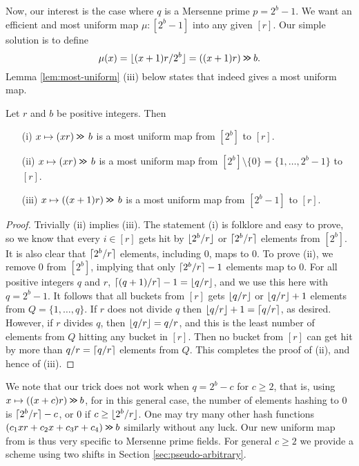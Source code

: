 Now, our interest is the case where $q$ is a Mersenne prime $p=2^b-1$. We want
an efficient and most uniform map $\mu:[2^b-1]$ into any given $[r]$.
Our simple solution is to define
\begin{equation}\label{eq:most-uniform}
   \mu(x)=\lfloor {(x+1)r/2^b} \rfloor=((x+1)r)\mathbin{\texttt{>\!>}} b.
\end{equation}
Lemma \ref{lem:most-uniform} (iii) below 
states that  indeed
gives a most uniform map. 
\begin{lemma}\label{lem:most-uniform} Let $r$ and $b$ be positive integers.
   Then
   \begin{itemize}
      \item[(i)] $x\mapsto (xr)\mathbin{\texttt{>\!>}}\,b$ is a most
         uniform map from $[2^b]$ to $[r]$.
      \item[(ii)] $x\mapsto (xr)\mathbin{\texttt{>\!>}}\,b$ is a most
         uniform map from $[2^b]\setminus\{0\}=\{1,\ldots,2^b-1\}$ to $[r]$.
      \item[(iii)] $x\mapsto ((x+1)r)\mathbin{\texttt{>\!>}} \, b$ is a most
         uniform map from $[2^b-1]$ to $[r]$.
   \end{itemize}
\end{lemma}
\begin{proof}
   Trivially (ii) implies (iii). 
   The statement (i) is folklore and easy to prove, so we know that every
   $i\in[r]$ gets hit by $\lfloor {2^b/r} \rfloor$ or $\lceil {2^b/r}\rceil$ elements from
   $[2^b]$. It is also clear that $\lceil {2^b/r}\rceil$ elements, including $0$,
   maps to $0$. To prove (ii), we remove $0$ from $[2^b]$, 
   implying that only
   $\lceil {2^b/r}\rceil-1$ elements map to $0$. For all positive integers $q$
   and $r$, $\lceil {(q+1)/r}\rceil-1=\lfloor {q/r} \rfloor$, and we use this here with 
   $q=2^b-1$. It follows that all buckets from $[r]$ gets $\lfloor {q/r} \rfloor$
   or $\lfloor {q/r} \rfloor+1$ elements from $Q=\{1,\ldots,q\}$. If $r$ does
   not divide $q$ then $\lfloor {q/r} \rfloor+1=\lceil {q/r}\rceil$, as desired. However,
   if $r$ divides $q$, then $\lfloor {q/r} \rfloor=q/r$, and this
   is the least number of elements from $Q$ hitting any bucket in $[r]$. Then 
   no bucket from $[r]$ can get hit by more than $q/r=\lceil {q/r}\rceil$ 
   elements from $Q$. This completes the proof of (ii), and hence of (iii).
\end{proof}
We note that our trick does not work when $q=2^b-c$ for $c\geq 2$, that is,
using $x\mapsto ((x+c)r)\mathbin{\texttt{>\!>}}  b$, for in this general case, 
the number of elements hashing to $0$ is $\lceil {2^b/r}\rceil-c$, or $0$ if
$c\geq \lfloor {2^b/r} \rfloor$.
One may try many other hash functions $(c_1 x r+ c_2 x+ c_3 r + c_4) \mathbin{\texttt{>\!>}} b$ similarly without any luck.
Our new uniform map from  is thus very specific to Mersenne prime fields.
For general $c\ge 2$ we provide a scheme using two shifts in
Section \ref{sec:pseudo-arbitrary}.

